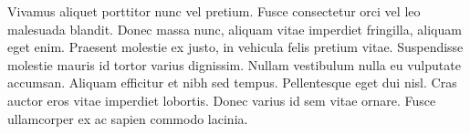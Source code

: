 Vivamus aliquet porttitor nunc vel pretium. Fusce consectetur orci vel leo malesuada blandit. Donec massa nunc, aliquam vitae imperdiet fringilla, aliquam eget enim. Praesent molestie ex justo, in vehicula felis pretium vitae. Suspendisse molestie mauris id tortor varius dignissim. Nullam vestibulum nulla eu vulputate accumsan. Aliquam efficitur et nibh sed tempus. Pellentesque eget dui nisl. Cras auctor eros vitae imperdiet lobortis. Donec varius id sem vitae ornare. Fusce ullamcorper ex ac sapien commodo lacinia.

